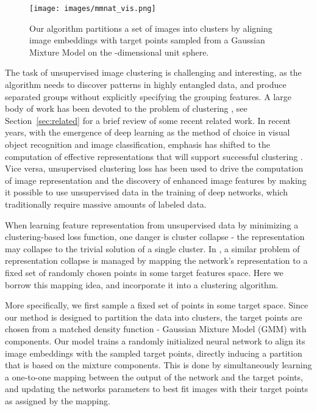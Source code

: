 \documentclass[a4paper,conference]{IEEEtran}
\begin{document}
\begin{figure}[t]
\begin{center}
   \texttt{[image: images/mmnat\_vis.png]}
   \vspace{-.3in}
\end{center}
   \caption{Our algorithm partitions a set of images into  clusters by aligning image embeddings with target points sampled from a Gaussian Mixture Model on the -dimensional unit sphere. }
   \vspace{-.142in}
\label{fig:mmnat_vis}
\end{figure}

The task of unsupervised image clustering is challenging and interesting, as the algorithm needs to discover patterns in highly entangled data, and produce separated groups without explicitly specifying the grouping features. A large body of work has been devoted to the problem of clustering \cite{jain1999data}, see Section~\ref{sec:related} for a brief review of some recent related work. In recent years, with the emergence of deep learning as the method of choice in visual object recognition and image classification, emphasis has shifted to the computation of effective representations that will support successful clustering \cite{min2018survey}. Vice versa, unsupervised clustering loss has been used to drive the computation of image representation and the discovery of enhanced image features by making it possible to use unsupervised data in the training of deep networks, which traditionally require massive amounts of labeled data.

When learning feature representation from unsupervised data by minimizing a clustering-based loss function, one danger is cluster collapse - the representation may collapse to the trivial solution of a single cluster. In \cite{BJ2017}, a similar problem of representation collapse is managed by mapping the network's representation to a fixed set of randomly chosen points in some target features space. Here we borrow this mapping idea, and incorporate it into a clustering algorithm. 

More specifically, we first sample a fixed set of points in some target space. Since our method is designed to partition the data into  clusters, 
the target points are chosen from a matched density function - Gaussian Mixture Model (GMM) with  components. Our model trains a randomly initialized neural network to align its image embeddings with the sampled target points, directly inducing a partition that is based on the mixture components. This is done by simultaneously learning a one-to-one mapping between the output of the network and the target points, and updating the networks parameters to best fit images with their target points as assigned by the mapping.
\end{document}
